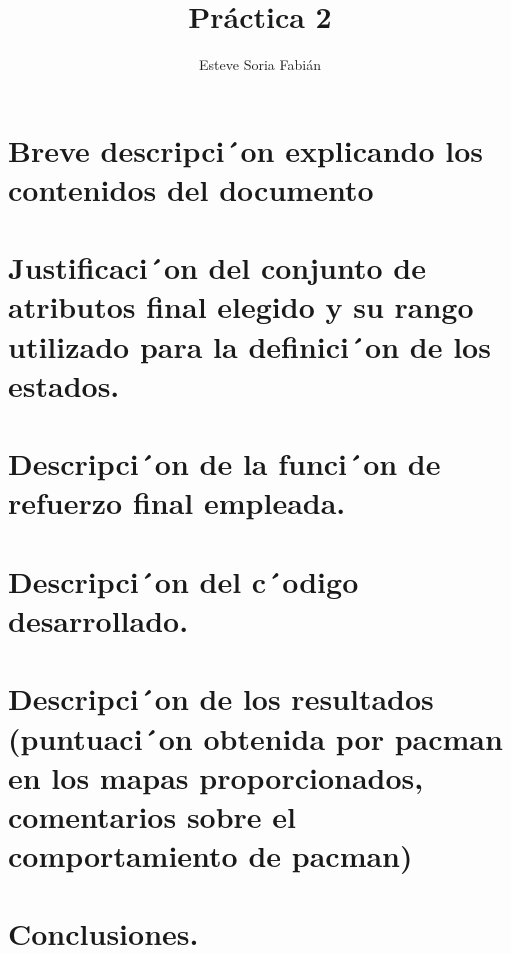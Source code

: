 \documentclass[12pt]{article}
\title{Práctica 2}
\author{Esteve Soria Fabián}
\begin{document}
    \maketitle

    \section{Breve descripci´on explicando los contenidos del documento}
    \section{Justificaci´on del conjunto de atributos final elegido y su rango utilizado para la definici´on de los
    estados.}
    \section{Descripci´on de la funci´on de refuerzo final empleada.}
    \section{Descripci´on del c´odigo desarrollado.}
    \section{Descripci´on de los resultados (puntuaci´on obtenida por pacman en los mapas proporcionados, comentarios
    sobre el comportamiento de pacman)}
    \section{Conclusiones.}
\end{document}
